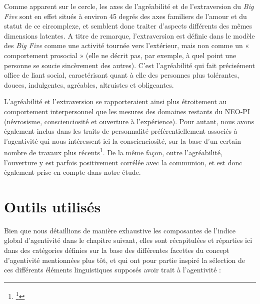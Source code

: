 Comme apparent sur le cercle, les axes de l'agréabilité et de l'extraversion du \textit{Big Five} sont en effet situés à environ 45 degrés des axes familiers de l'amour et du statut de ce circomplexe, et semblent donc traiter d'aspects différents des mêmes dimensions latentes. A titre de remarque, l'extraversion est définie dans le modèle des \textit{Big Five} comme une activité tournée vers l'extérieur, mais non comme un « comportement prosocial » (elle ne décrit pas, par exemple, à quel point une personne se soucie sincèrement des autres). C'est l'agréabilité qui fait précisément office de liant social, caractérisant quant à elle des personnes plus tolérantes, douces, indulgentes, agréables, altruistes et obligeantes. 

L'agréabilité et l'extraversion se rapporteraient ainsi plus étroitement au comportement interpersonnel que les mesures des domaines restants du NEO-PI (névrosisme, conscienciosité et ouverture à l'expérience). Pour autant, nous avons également inclus dans les traits de personnalité préférentiellement associés à l’agentivité qui nous intéressent ici la conscienciosité, sur la base d’un certain nombre de travaux plus récents\footnote{\cite{hurley_agency_1998}\footnote{\cite{abele_facets_2016} - en notant que dans cette étude et en dépit de la définition retenue dans le \textit{Big Five}, l'extraversion est également associée à la Communion. Cela rend donc l'ajout la consciensioté plus pertinent encore, afin que notre méthode de validation externe ait toutes les chances d'être concluante}}. De la même façon, outre l'agréabilité, l'ouverture y est parfois positivement corrélée avec la communion, et est donc également prise en compte dans notre étude.

\section{Outils utilisés}

Bien que nous détaillions de manière exhaustive les composantes de l’indice global d’agentivité dans le chapitre suivant, elles sont récapitulées et réparties ici dans des catégories définies sur la base des différentes facettes du concept d’agentivité mentionnées plus tôt, et qui ont pour partie inspiré la sélection de ces différents éléments linguistiques supposés avoir trait à l’agentivité :  


